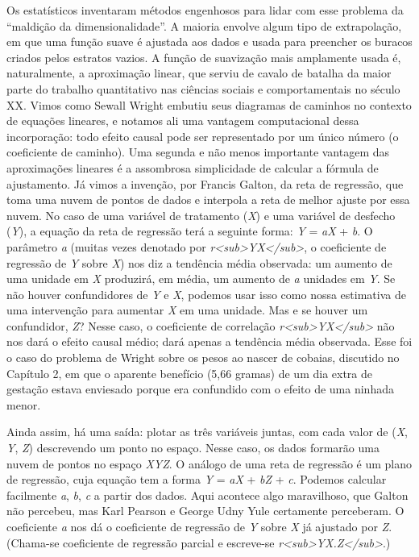 \documentclass[11pt,a5paper,twoside]{book}
\begin{document}
Os estatísticos inventaram métodos engenhosos para lidar com esse problema da “maldição da dimensionalidade”. A maioria envolve algum tipo de extrapolação, em que uma função suave é ajustada aos dados e usada para preencher os buracos criados pelos estratos vazios. A função de suavização mais amplamente usada é, naturalmente, a aproximação linear, que serviu de cavalo de batalha da maior parte do trabalho quantitativo nas ciências sociais e comportamentais no século XX. Vimos como Sewall Wright embutiu seus diagramas de caminhos no contexto de equações lineares, e notamos ali uma vantagem computacional dessa incorporação: todo efeito causal pode ser representado por um único número (o coeficiente de caminho). Uma segunda e não menos importante vantagem das aproximações lineares é a assombrosa simplicidade de calcular a fórmula de ajustamento. Já vimos a invenção, por Francis Galton, da reta de regressão, que toma uma nuvem de pontos de dados e interpola a reta de melhor ajuste por essa nuvem. No caso de uma variável de tratamento (\textit{X}) e uma variável de desfecho (\textit{Y}), a equação da reta de regressão terá a seguinte forma: \textit{Y} = \textit{aX} + \textit{b}. O parâmetro \textit{a} (muitas vezes denotado por \textit{r<sub>YX</sub>}, o coeficiente de regressão de \textit{Y} sobre \textit{X}) nos diz a tendência média observada: um aumento de uma unidade em \textit{X} produzirá, em média, um aumento de \textit{a} unidades em \textit{Y}. Se não houver confundidores de \textit{Y} e \textit{X}, podemos usar isso como nossa estimativa de uma intervenção para aumentar \textit{X} em uma unidade. Mas e se houver um confundidor, \textit{Z}? Nesse caso, o coeficiente de correlação \textit{r<sub>YX</sub>} não nos dará o efeito causal médio; dará apenas a tendência média observada. Esse foi o caso do problema de Wright sobre os pesos ao nascer de cobaias, discutido no Capítulo 2, em que o aparente benefício (5,66 gramas) de um dia extra de gestação estava enviesado porque era confundido com o efeito de uma ninhada menor.

Ainda assim, há uma saída: plotar as três variáveis juntas, com cada valor de (\textit{X}, \textit{Y}, \textit{Z}) descrevendo um ponto no espaço. Nesse caso, os dados formarão uma nuvem de pontos no espaço \textit{XYZ}. O análogo de uma reta de regressão é um plano de regressão, cuja equação tem a forma \textit{Y} = \textit{aX} + \textit{bZ} + \textit{c}. Podemos calcular facilmente \textit{a}, \textit{b}, \textit{c} a partir dos dados. Aqui acontece algo maravilhoso, que Galton não percebeu, mas Karl Pearson e George Udny Yule certamente perceberam. O coeficiente \textit{a} nos dá o coeficiente de regressão de \textit{Y} sobre \textit{X} já ajustado por \textit{Z}. (Chama-se coeficiente de regressão parcial e escreve-se \textit{r<sub>YX.Z</sub>}.)
\end{document}
